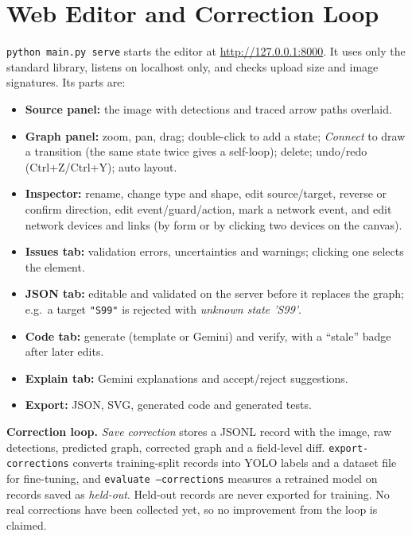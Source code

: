 \documentclass[journal,10pt]{IEEEtran}
\newcommand{\code}[1]{\texttt{#1}}
\begin{document}
\section{Web Editor and Correction Loop}
\label{sec:editor}
\code{python main.py serve} starts the editor at \url{http://127.0.0.1:8000}. It uses only
the standard library, listens on localhost only, and checks upload size and image
signatures. Its parts are:
\begin{itemize}
\item \textbf{Source panel:} the image with detections and traced arrow paths overlaid.
\item \textbf{Graph panel:} zoom, pan, drag; double-click to add a state; \emph{Connect}
to draw a transition (the same state twice gives a self-loop); delete; undo/redo
(Ctrl+Z/Ctrl+Y); auto layout.
\item \textbf{Inspector:} rename, change type and shape, edit source/target, reverse or
confirm direction, edit event/guard/action, mark a network event, and edit network devices
and links (by form or by clicking two devices on the canvas).
\item \textbf{Issues tab:} validation errors, uncertainties and warnings; clicking one
selects the element.
\item \textbf{JSON tab:} editable and validated on the server before it replaces the
graph; e.g.\ a target \code{"S99"} is rejected with \emph{unknown state 'S99'}.
\item \textbf{Code tab:} generate (template or Gemini) and verify, with a ``stale'' badge
after later edits.
\item \textbf{Explain tab:} Gemini explanations and accept/reject suggestions.
\item \textbf{Export:} JSON, SVG, generated code and generated tests.
\end{itemize}

\textbf{Correction loop.} \emph{Save correction} stores a JSONL record with the image, raw
detections, predicted graph, corrected graph and a field-level diff.
\code{export-corrections} converts training-split records into YOLO labels and a dataset
file for fine-tuning, and \code{evaluate --corrections} measures a retrained model on
records saved as \emph{held-out}. Held-out records are never exported for training. No
real corrections have been collected yet, so no improvement from the loop is claimed.

\end{document}
